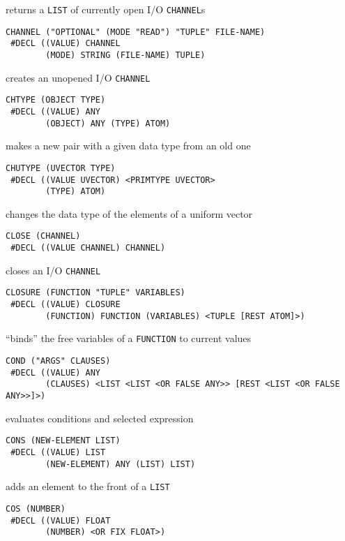 \documentclass[a4paper]{scrbook}
\begin{document}
returns a \texttt{LIST} of currently open I/O \texttt{CHANNEL}s

\begin{verbatim}
CHANNEL ("OPTIONAL" (MODE "READ") "TUPLE" FILE-NAME)
 #DECL ((VALUE) CHANNEL
        (MODE) STRING (FILE-NAME) TUPLE)
\end{verbatim}

creates an unopened I/O \texttt{CHANNEL}

\begin{verbatim}
CHTYPE (OBJECT TYPE)
 #DECL ((VALUE) ANY
        (OBJECT) ANY (TYPE) ATOM)
\end{verbatim}

makes a new pair with a given data type from an old one

\begin{verbatim}
CHUTYPE (UVECTOR TYPE)
 #DECL ((VALUE UVECTOR) <PRIMTYPE UVECTOR>
        (TYPE) ATOM)
\end{verbatim}

changes the data type of the elements of a uniform vector

\begin{verbatim}
CLOSE (CHANNEL)
 #DECL ((VALUE CHANNEL) CHANNEL)
\end{verbatim}

closes an I/O \texttt{CHANNEL}

\begin{verbatim}
CLOSURE (FUNCTION "TUPLE" VARIABLES)
 #DECL ((VALUE) CLOSURE
        (FUNCTION) FUNCTION (VARIABLES) <TUPLE [REST ATOM]>)
\end{verbatim}

``binds'' the free variables of a \texttt{FUNCTION} to current values

\begin{verbatim}
COND ("ARGS" CLAUSES)
 #DECL ((VALUE) ANY
        (CLAUSES) <LIST <LIST <OR FALSE ANY>> [REST <LIST <OR FALSE ANY>>]>)
\end{verbatim}

evaluates conditions and selected expression

\begin{verbatim}
CONS (NEW-ELEMENT LIST)
 #DECL ((VALUE) LIST
        (NEW-ELEMENT) ANY (LIST) LIST)
\end{verbatim}

adds an element to the front of a \texttt{LIST}

\begin{verbatim}
COS (NUMBER)
 #DECL ((VALUE) FLOAT
        (NUMBER) <OR FIX FLOAT>)
\end{verbatim}
\end{document}

